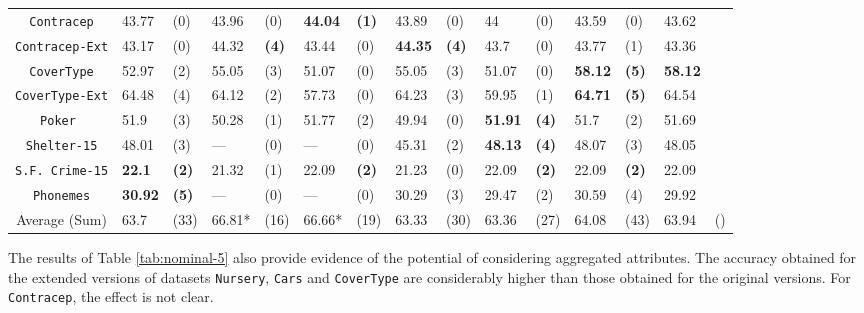 \begin{table*}[t]
\begin{tabularx}{\textwidth}{c|XX|XX|XX|XX|XX|XX|XX}
{\tt Contracep}     & 43.77    & (0)    & 43.96    & (0)    &{\bf44.04}&{\bf(1)}& 43.89    & (0)    & 44       & (0)    & 43.59    & (0)             & 43.62    &    \\
{\tt Contracep-Ext} & 43.17    & (0)    & 44.32    &{\bf(4)}& 43.44    & (0)    &{\bf44.35}&{\bf(4)}& 43.7     & (0)    & 43.77    & (1)             & 43.36    &    \\
{\tt CoverType}     & 52.97    & (2)    & 55.05    & (3)    & 51.07    & (0)    & 55.05    & (3)    & 51.07    & (0)    &{\bf58.12}&{\bf(5)}         &{\bf58.12}&    \\
{\tt CoverType-Ext} & 64.48    & (4)    & 64.12    & (2)    & 57.73    & (0)    & 64.23    & (3)    & 59.95    & (1)    &{\bf64.71}&{\bf(5)}         & 64.54    &    \\ 
{\tt Poker }        & 51.9     & (3)    & 50.28    & (1)    & 51.77    & (2)    & 49.94    & (0)    &{\bf51.91}&{\bf(4)}& 51.7     & (2)             & 51.69    &    \\
{\tt Shelter-15}    & 48.01    & (3)    & ---      & (0)    & ---      & (0)    & 45.31    & (2)    &{\bf48.13}&{\bf(4)}& 48.07    & (3)             & 48.05    &    \\   
{\tt S.F. Crime-15} &{\bf22.1} &{\bf(2)}& 21.32    & (1)    & 22.09    &{\bf(2)}& 21.23    & (0)    & 22.09    &{\bf(2)}& 22.09    &{\bf(2)}         & 22.09    &    \\
{\tt Phonemes}      &{\bf30.92}&{\bf(5)}& ---      & (0)    & ---      & (0)    & 30.29    & (3)    & 29.47    & (2)    & 30.59    & (4)             & 29.92    &    \\
\hline
Average (Sum)       &     63.7 & (33)   & 66.81*   & (16)   & 66.66*   & (19)   & 63.33    & (30)   & 63.36    & (27)   & 64.08    & (43)            & 63.94    & ()

\end{tabularx}
\caption{Average accuracy and statistical tests  for  decision trees 
with depth at most 5 using only nominal attributes. The best accuracy for each dataset is bold-faced. Experiments that did not finish in reasonable time are considered statistically worse than the others. These criteria have a * mark besides their average accuracies, since they are calculated only on the experiments that finished.}
\label{tab:nominal-5}
\normalsize
\end{table*}


The results of  Table \ref{tab:nominal-5} also
provide evidence of  the potential
of considering aggregated attributes. 
The accuracy obtained for the extended versions of datasets
{\tt Nursery}, {\tt Cars} and {\tt CoverType} are considerably higher than those obtained for 
the original versions. For {\tt Contracep}, the effect is not clear.

